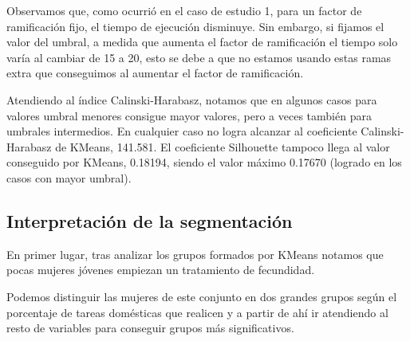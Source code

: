 \documentclass[a4paper, 20pt]{article}
\begin{document}
Observamos que, como ocurrió en el caso de estudio 1, para un factor de ramificación fijo, el tiempo de ejecución disminuye. Sin embargo, si fijamos el valor del umbral, a medida que aumenta el factor de ramificación el tiempo solo varía al cambiar de 15 a 20, esto se debe a que no estamos usando estas ramas extra que conseguimos al aumentar el factor de ramificación.

Atendiendo al índice Calinski-Harabasz, notamos que en algunos casos para valores umbral menores consigue mayor valores, pero a veces también para umbrales intermedios. En cualquier caso no logra alcanzar al coeficiente Calinski-Harabasz de KMeans, 141.581. El coeficiente Silhouette tampoco llega al valor conseguido por KMeans, 0.18194, siendo el valor máximo 0.17670 (logrado en los casos con mayor umbral).

\subsection{Interpretación de la segmentación}

En primer lugar, tras analizar los grupos formados por KMeans notamos que pocas mujeres jóvenes empiezan un tratamiento de fecundidad.

Podemos distinguir las mujeres de este conjunto en dos grandes grupos según el porcentaje de tareas domésticas que realicen y a partir de ahí ir atendiendo al resto de variables para conseguir grupos más significativos.

\newpage
\printbibliography
\end{document}
